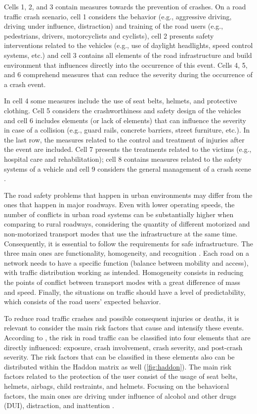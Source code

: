 Cells 1, 2, and 3 contain measures towards the prevention of crashes. On a road traffic crash scenario, cell 1 considers the behavior (e.g., aggressive driving, driving under influence, distraction) and training of the road users (e.g., pedestrians, drivers, motorcyclists and cyclists), cell 2 presents safety interventions related to the vehicles (e.g., use of daylight headlights, speed control systems, etc.) and cell 3 contains all elements of the road infrastructure and build environment that influences directly into the occurrence of this event. Cells 4, 5, and 6 comprehend measures that can reduce the severity during the occurrence of a crash event.

In cell 4 some measures include the use of seat belts, helmets, and protective clothing. Cell 5 considers the crashworthiness and safety design of the vehicles and cell 6 includes elements (or lack of elements) that can influence the severity in case of a collision (e.g., guard rails, concrete barriers, street furniture, etc.). In the last row, the measures related to the control and treatment of injuries after the event are included. Cell 7 presents the treatments related to the victims (e.g., hospital care and rehabilitation); cell 8 contains measures related to the safety systems of a vehicle and cell 9 considers the general management of a crash scene \cite{Mohan2016}. 

The road safety problems that happen in urban environments may differ from the ones that happen in major roadways. Even with lower operating speeds, the number of conflicts in urban road systems can be substantially higher when comparing to rural roadways, considering the quantity of different motorized and non-motorized transport modes that use the infrastructure at the same time. Consequently, it is essential to follow the requirements for safe infrastructure. The three main ones are functionality, homogeneity, and recognition \cite{SWOV2003}. Each road on a network needs to have a specific function (balance between mobility and access), with traffic distribution working as intended. Homogeneity consists in reducing the points of conflict between transport modes with a great difference of mass and speed. Finally, the situations on traffic should have a level of predictability, which consists of the road users' expected behavior. 

To reduce road traffic crashes and possible consequent injuries or deaths, it is relevant to consider the main risk factors that cause and intensify these events. According to \textcite{WHO2004}, the risk in road traffic can be classified into four elements that are directly influenced: exposure, crash involvement, crash severity, and post-crash severity. The risk factors that can be classified in these elements also can be distributed within the Haddon matrix as well (\autoref{fig:haddon}). The main risk factors related to the protection of the user consist of the usage of seat belts, helmets, airbags, child restraints, and helmets. Focusing on the behavioral factors, the main ones are driving under influence of alcohol and other drugs (DUI), distraction, and inattention \cite{Shinar2017}.

